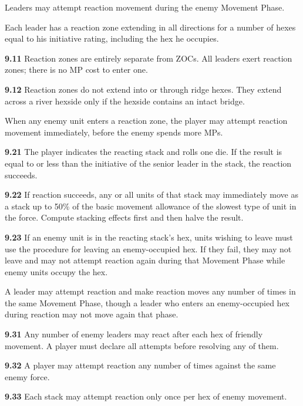 
Leaders may attempt reaction movement during the enemy Movement Phase.


Each leader has a reaction zone extending in all directions for a number of hexes equal to his initiative rating, including the hex he occupies.

\textbf{9.11} Reaction zones are entirely separate from ZOCs. All leaders exert reaction zones; there is no MP cost to enter one.

\textbf{9.12} Reaction zones do not extend into or through ridge hexes. They extend across a river hexside only if the hexside contains an intact bridge.


When any enemy unit enters a reaction zone, the player may attempt reaction movement immediately, before the enemy spends more MPs.

\textbf{9.21} The player indicates the reacting stack and rolls one die. If the result is equal to or less than the initiative of the senior leader in the stack, the reaction succeeds.

\textbf{9.22} If reaction succeeds, any or all units of that stack may immediately move as a stack up to 50\% of the basic movement allowance of the slowest type of unit in the force. Compute stacking effects first and then halve the result.

\textbf{9.23} If an enemy unit is in the reacting stack's hex, units wishing to leave must use the procedure for leaving an enemy-occupied hex. If they fail, they may not leave and may not attempt reaction again during that Movement Phase while enemy units occupy the hex.


A leader may attempt reaction and make reaction moves any number of times in the same Movement Phase, though a leader who enters an enemy-occupied hex during reaction may not move again that phase.

\textbf{9.31} Any number of enemy leaders may react after each hex of friendly movement. A player must declare all attempts before resolving any of them.

\textbf{9.32} A player may attempt reaction any number of times against the same enemy force.

\textbf{9.33} Each stack may attempt reaction only once per hex of enemy movement.

